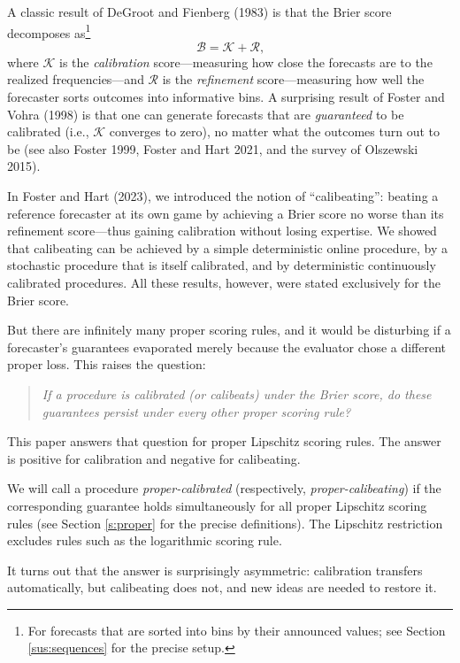 \documentclass[12pt,a4paper,notitlepage]{article}
\begin{document}
A classic result of DeGroot and Fienberg (1983) is that the Brier score
decomposes as\footnote{%
For forecasts that are sorted into bins by their announced values; see
Section \ref{sus:sequences} for the precise setup.}
$$\mathcal{B}=\mathcal{K}+\mathcal{R}\text{,}$$
where $\mathcal{K}$ is the \emph{calibration} score---measuring how close
the forecasts are to the realized frequencies---and $\mathcal{R}$ is the
\emph{refinement} score---measuring how well the forecaster sorts outcomes
into informative bins. A surprising result of Foster and Vohra (1998) is
that one can generate forecasts that are \emph{guaranteed} to be calibrated
(i.e., $\mathcal{K}$ converges to zero), no matter what the outcomes turn
out to be (see also Foster 1999, Foster and Hart 2021, and the survey of
Olszewski 2015).

In Foster and Hart (2023), we introduced the notion of
\textquotedblleft calibeating\textquotedblright : beating a reference
forecaster at its own game by achieving a Brier score no worse than its
refinement score---thus gaining calibration without losing expertise. We
showed that calibeating can be achieved by a simple deterministic online
procedure, by a stochastic procedure that is itself calibrated, and by
deterministic continuously calibrated procedures. All these results,
however, were stated exclusively for the Brier score.

But there are infinitely many proper scoring rules, and it would be
disturbing if a forecaster's guarantees evaporated merely because the
evaluator chose a different proper loss. This raises the question:%
\begin{quote}
\emph{If a procedure is calibrated (or calibeats) under the Brier score, do
these guarantees persist under every other proper scoring rule?}
\end{quote}
This paper answers that question for proper Lipschitz scoring rules. The
answer is positive for calibration and negative for calibeating.

We will call a procedure \emph{proper-calibrated} (respectively, \emph{%
proper-calibeating}) if the corresponding guarantee holds simultaneously
for all proper Lipschitz scoring rules (see Section \ref{s:proper} for the
precise definitions). The Lipschitz restriction excludes rules such as
the logarithmic scoring rule.

It turns out that the answer is surprisingly asymmetric: calibration
transfers automatically, but calibeating does not, and new ideas are needed
to restore it.
\end{document}
